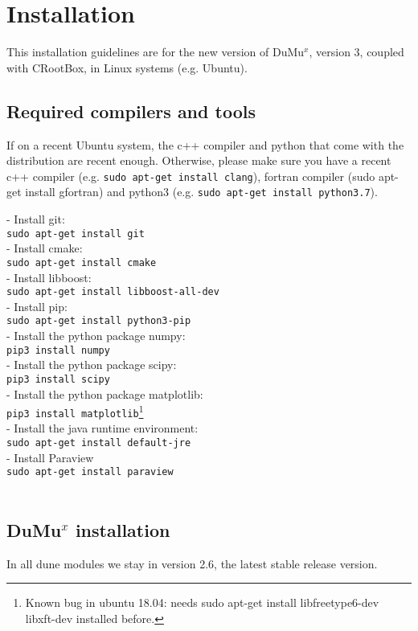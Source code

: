 \chapter*{Installation}
This installation guidelines are for the new version of DuMu$^{x}$, version 3, coupled with CRootBox, in Linux systems (e.g. Ubuntu). 

\section*{Required compilers and tools}
%
If on a recent Ubuntu system, the c++ compiler and python that come with the distribution are recent enough. Otherwise, please make sure you have a recent c++ compiler (e.g. \lstinline{sudo apt-get install clang}), fortran compiler (sudo apt-get install gfortran) and python3 (e.g. \lstinline{sudo apt-get install python3.7}). 

- Install git: \\
\lstinline{sudo apt-get install git}\\
- Install cmake:\\
\lstinline{sudo apt-get install cmake}\\
- Install libboost:\\
\lstinline{sudo apt-get install libboost-all-dev}\\
- Install pip:\\
\lstinline{sudo apt-get install python3-pip}\\
- Install the python package numpy:\\
\lstinline{pip3 install numpy}\\
- Install the python package scipy:\\
\lstinline{pip3 install scipy}\\
- Install the python package matplotlib:\\
\lstinline{pip3 install matplotlib}\footnote{Known bug in ubuntu 18.04: needs sudo apt-get install libfreetype6-dev libxft-dev installed before.}\\
- Install the java runtime environment:\\
\lstinline{sudo apt-get install default-jre}\\
- Install Paraview\\
\lstinline{sudo apt-get install paraview}\\


\lstinline{}\\

\section*{DuMu$^x$ installation}
In all dune modules we stay in version 2.6, the latest stable release version. 

